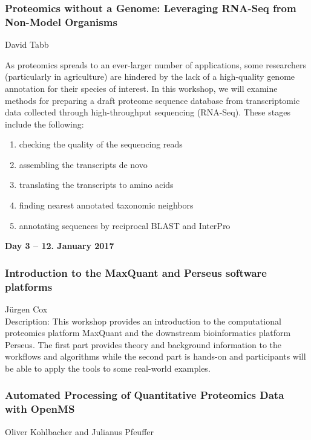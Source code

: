 \subsubsection*{\color{eubicRed} Proteomics without a Genome: Leveraging RNA-Seq from Non-Model Organisms}
{\color{eubicGray} David Tabb}

As proteomics spreads to an ever-larger number of applications, some researchers
(particularly in agriculture) are hindered by the lack of a high-quality genome
annotation for their species of interest.  In this workshop, we will examine
methods for preparing a draft proteome sequence database from transcriptomic
data collected through high-throughput sequencing (RNA-Seq). These stages
include the following:
\begin{enumerate}
  \item checking the quality of the sequencing reads
  \item assembling the transcripts de novo
  \item translating the transcripts to amino acids
  \item finding nearest annotated taxonomic neighbors
  \item annotating sequences by reciprocal BLAST and InterPro
\end{enumerate}


\noindent\textbf{Day 3 -- 12. January 2017}


\subsubsection*{\color{eubicRed} Introduction to the MaxQuant and Perseus software platforms}
{\color{eubicGray} Jürgen Cox}\\
Description: This workshop provides an introduction to the computational proteomics platform MaxQuant and the downstream bioinformatics platform Perseus. The first part provides theory and background information to the workflows and algorithms while the second part is hands-on and participants will be able to apply the tools to some real-world examples.


\subsubsection*{\color{eubicRed} Automated Processing of Quantitative Proteomics Data with OpenMS}
{\color{eubicGray} Oliver Kohlbacher and Julianus Pfeuffer}

